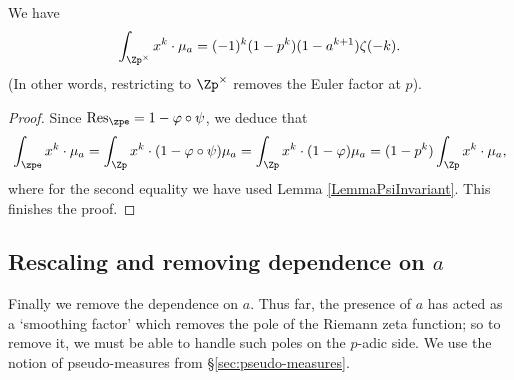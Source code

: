 \documentclass[a4paper,10pt, english, reqno]{smfart}
\numberwithin{equation}{section}
\begin{document}
\begin{proposition} \label{PropInterpolation1}
We have
\begin{equation}\label{eq:first interpolation}
	\int_{\Zp^\times}x^k \cdot\mu_a = (-1)^k(1-p^k)(1-a^{k+1})\zeta(-k).
\end{equation}
(In other words, restricting to $\Zp^\times$ removes the Euler factor at $p$).
\end{proposition}

\begin{proof}
Since $\mathrm{Res}_{\zpe} = 1 - \varphi \circ \psi$, we deduce that
\[\int_{\zpe} x^k \cdot\mu_a = \int_{\Zp} x^k \cdot (1 - \varphi \circ \psi) \mu_a = \int_{\Zp} x^k \cdot (1 - \varphi)\mu_a = (1 - p^k) \int_{\Zp} x^k \cdot \mu_a,\]
where for the second equality we have used Lemma \ref{LemmaPsiInvariant}. This finishes the proof.
\end{proof}




\subsection{Rescaling and removing dependence on $a$}\label{sec:dep on a}

Finally we remove the dependence on $a$. Thus far, the presence of $a$ has acted as a `smoothing factor' which removes the pole of the Riemann zeta function; so to remove it, we must be able to handle such poles on the $p$-adic side. We use the notion of pseudo-measures from \S\ref{sec:pseudo-measures}.
\end{document}
